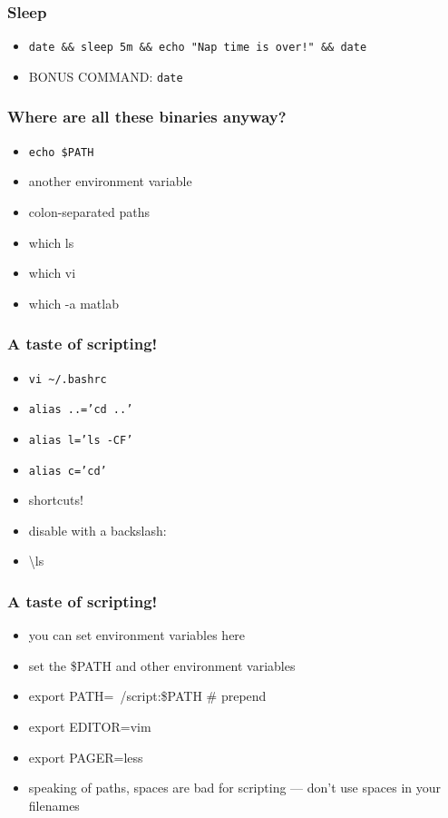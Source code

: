 \documentclass[%
        hyperref={%
                pdfauthor={Zakariyya Mughal},%
                pdfpagemode={None},pdfpagelayout={SinglePage}}%
        xcolor={x11names},%
]{beamer}
\begin{document}
\begin{frame}
	\frametitle{Sleep}
	\begin{itemize}
		\item \texttt{date \&\& sleep 5m \&\& echo "Nap
		time is over!" \&\& date }
		\pause\item BONUS COMMAND: \texttt{date}
	\end{itemize}
\end{frame}
\begin{frame}
	\frametitle{Where are all these binaries anyway?}
	\begin{itemize}
		\item \texttt{echo \$PATH}
		\item another environment variable
		\pause\item colon-separated paths
		\item which ls
		\item which vi
		\item which -a matlab
	\end{itemize}
\end{frame}
\begin{frame}
	\frametitle{A taste of scripting!}
	\begin{itemize}
		\item \texttt{vi \textasciitilde/.bashrc}
		\item \texttt{alias ..='cd ..'}
		\item \texttt{alias l='ls -CF'}
		\item \texttt{alias c='cd'}
		\item shortcuts!
		\pause\item disable with a backslash:
		\item \textbackslash{}ls
	\end{itemize}
\end{frame}
\begin{frame}
	\frametitle{A taste of scripting!}
	\begin{itemize}
		\item you can set environment variables here
		\item set the \$PATH and other environment variables
		\item export PATH=~/script:\$PATH \# prepend
		\item export EDITOR=vim
		\item export PAGER=less
		\pause\item speaking of paths, spaces are bad for scripting --- don't use spaces in your filenames
	\end{itemize}
\end{frame}
\end{document}
